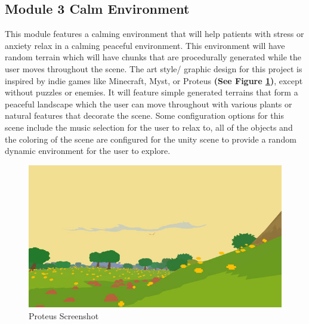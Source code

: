 \documentclass[a4paper,10pt]{article}
\begin{document}
\subsection{Module 3 Calm Environment} %
This module features a calming environment that will help patients with stress or anxiety relax in a calming peaceful environment. This environment will have random terrain which will have chunks that are procedurally generated while the user moves throughout the scene.  The art style/ graphic design for this project is inspired by indie games like Minecraft, Myst, or Proteus \textbf{(See Figure \ref{fig:proteus})}, except without puzzles or enemies. It will feature simple generated terrains that form a  peaceful landscape which the user can move throughout with various plants or natural features that decorate the scene.  Some configuration options for this scene include the music selection for the user to relax to, all of the objects and the coloring of the scene are configured for the unity scene to provide a random dynamic environment for the user to explore.

\begin{figure}[H]
	\centerline{\includegraphics[scale= 0.4]{proteus.jpg}}
	\caption{Proteus Screenshot}
	\label{fig:proteus}
\end{figure}
\end{document}
